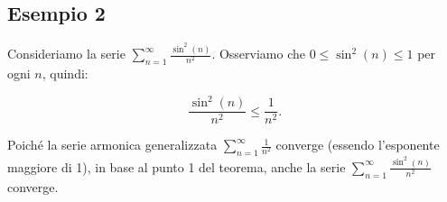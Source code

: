 \documentclass[12pt]{article} %
\begin{document}
\subsection*{Esempio 2}

Consideriamo la serie $\sum_{n=1}^{\infty} \frac{\sin^2(n)}{n^2}$. Osserviamo che $0 \leq \sin^2(n) \leq 1$ per ogni $n$, quindi:

\[
\frac{\sin^2(n)}{n^2} \leq \frac{1}{n^2}.
\]

Poiché la serie armonica generalizzata $\sum_{n=1}^{\infty} \frac{1}{n^2}$ converge (essendo l’esponente maggiore di 1), in base al punto 1 del teorema, anche la serie $\sum_{n=1}^{\infty} \frac{\sin^2(n)}{n^2}$ converge.
\end{document}
